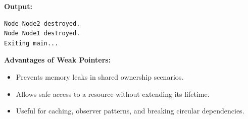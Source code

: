 \documentclass{report}
\begin{document}
\textbf{Output:}
\begin{verbatim}
Node Node2 destroyed.
Node Node1 destroyed.
Exiting main...
\end{verbatim}

\textbf{Advantages of Weak Pointers:}
\begin{itemize}
	\item Prevents memory leaks in shared ownership scenarios.
	\item Allows safe access to a resource without extending its lifetime.
	\item Useful for caching, observer patterns, and breaking circular dependencies.
\end{itemize}
\end{document}
